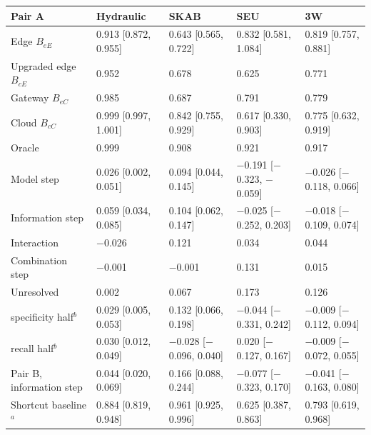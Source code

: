 \begin{tabular}{@{}>{\raggedright\arraybackslash}p{2.2cm} llll@{}}
\toprule
Pair A & Hydraulic & SKAB & SEU & 3W \\
\midrule
Edge $B_{eE}$ & 0.913 [0.872, 0.955] & 0.643 [0.565, 0.722] & 0.832 [0.581, 1.084] & 0.819 [0.757, 0.881] \\
Upgraded edge $B_{cE}$ & 0.952 & 0.678 & 0.625 & 0.771 \\
Gateway $B_{eC}$ & 0.985 & 0.687 & 0.791 & 0.779 \\
Cloud $B_{cC}$ & 0.999 [0.997, 1.001] & 0.842 [0.755, 0.929] & 0.617 [0.330, 0.903] & 0.775 [0.632, 0.919] \\
Oracle & 0.999 & 0.908 & 0.921 & 0.917 \\
Model step & 0.026 [0.002, 0.051] & 0.094 [0.044, 0.145] & $-$0.191 [$-$0.323, $-$0.059] & $-$0.026 [$-$0.118, 0.066] \\
Information step & 0.059 [0.034, 0.085] & 0.104 [0.062, 0.147] & $-$0.025 [$-$0.252, 0.203] & $-$0.018 [$-$0.109, 0.074] \\
Interaction & $-$0.026 & 0.121 & 0.034 & 0.044 \\
Combination step & $-$0.001 & $-$0.001 & 0.131 & 0.015 \\
Unresolved & 0.002 & 0.067 & 0.173 & 0.126 \\
\quad specificity half$^{b}$ & 0.029 [0.005, 0.053] & 0.132 [0.066, 0.198] & $-$0.044 [$-$0.331, 0.242] & $-$0.009 [$-$0.112, 0.094] \\
\quad recall half$^{b}$ & 0.030 [0.012, 0.049] & $-$0.028 [$-$0.096, 0.040] & 0.020 [$-$0.127, 0.167] & $-$0.009 [$-$0.072, 0.055] \\
\addlinespace
Pair B, information step & 0.044 [0.020, 0.069] & 0.166 [0.088, 0.244] & $-$0.077 [$-$0.323, 0.170] & $-$0.041 [$-$0.163, 0.080] \\
Shortcut baseline$^{a}$ & 0.884 [0.819, 0.948] & 0.961 [0.925, 0.996] & 0.625 [0.387, 0.863] & 0.793 [0.619, 0.968] \\
\bottomrule
\end{tabular}
